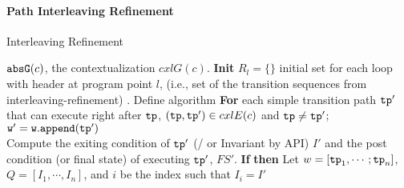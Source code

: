 \paragraph{Path Interleaving Refinement}
\begin{algorithm}
  \caption{
  {Interleaving Refinement}
  \label{alg:prog-refine}
  }
  \begin{algorithmic}[1]
  \REQUIRE $\mathtt{abs}{\mathtt{G}}(c)$, the contextualization $cxlG(c)$.
  \STATE  \textbf{Init} 
  $R_l = \{\}$ initial set for each loop with header at program point $l$, (i.e., set of the transition sequences from interleaving-refinement) .
  \STATE Define algorithm 
  \STATE {}
  \STATE \quad \textbf{For} each simple transition path $\mathtt{tp}'$ that can execute right after $\mathtt{tp}$,
  $(\mathtt{tp}, \mathtt{tp}') \in cxlE(c)$ and $\mathtt{tp} \neq \mathtt{tp}'$;
  \\
  \STATE \quad \quad $\mathtt{w' = w.append(\mathtt{tp}')}$
  \\
  \quad \quad {}
  \STATE  \quad \quad Compute the exiting condition of $\mathtt{tp}'$ (/ or Invariant by  API) $I'$ and the 
  post condition (or final state) of executing $\mathtt{tp}'$, $FS'$.
  \STATE \quad \quad \textbf{If} 
  \STATE \quad \quad \textbf{then}
  Let $w = [\mathtt{tp}_1, \cdots; \mathtt{tp}_n]$, $Q = [I_1, \cdots, I_n]$, and $i$ be the index such that $I_i = I'$
  \\ \quad \quad \quad \quad \quad

\end{algorithmic}
\end{algorithm}
